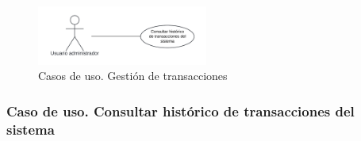 \begin{figure}[H]
    \centering
    \includegraphics[width=0.5\textwidth]{figures/6-Analisis/6-Casos-uso/6_3_5_Gestion-transacciones.png}
    \caption{Casos de uso. Gestión de transacciones}
    \label{fig:cu_gestion-transacciones}
\end{figure}

\subsubsection{Caso de uso. Consultar histórico de transacciones del sistema} \label{sec:cu_transacciones-sistema}
